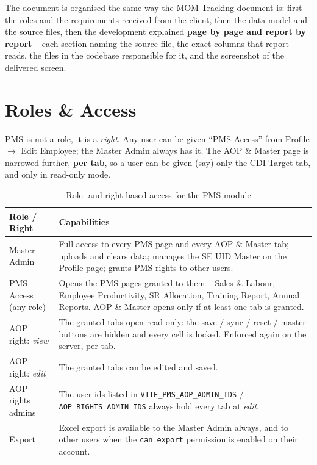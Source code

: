 \documentclass[11pt,a4paper]{article}
\newcommand{\qt}[1]{\textquotedblleft #1\textquotedblright}
\newcommand{\file}[1]{\texttt{\small #1}}
\begin{document}
The document is organised the same way the MOM Tracking document is: first the roles
and the requirements received from the client, then the data model and the source
files, then the development explained \textbf{page by page and report by report} --
each section naming the source file, the exact columns that report reads, the files in
the codebase responsible for it, and the screenshot of the delivered screen.

\section{Roles \& Access}

PMS is not a role, it is a \emph{right}. Any user can be given \qt{PMS Access} from
Profile $\rightarrow$ Edit Employee; the Master Admin always has it. The AOP \& Master
page is narrowed further, \textbf{per tab}, so a user can be given (say) only the CDI
Target tab, and only in read-only mode.

\begin{table}[H]\centering\small
\begin{tabularx}{\linewidth}{@{}p{3.4cm}X@{}}
\toprule
\textbf{Role / Right} & \textbf{Capabilities} \\
\midrule
Master Admin &
Full access to every PMS page and every AOP \& Master tab; uploads and clears data;
manages the SE UID Master on the Profile page; grants PMS rights to other users. \\
\addlinespace
PMS Access (any role) &
Opens the PMS pages granted to them -- Sales \& Labour, Employee Productivity,
SR Allocation, Training Report, Annual Reports. AOP \& Master opens only if at least
one tab is granted. \\
\addlinespace
AOP right: \textit{view} &
The granted tabs open read-only: the save / sync / reset / master buttons are hidden
and every cell is locked. Enforced again on the server, per tab. \\
\addlinespace
AOP right: \textit{edit} &
The granted tabs can be edited and saved. \\
\addlinespace
AOP rights admins &
The user ids listed in \file{VITE\_PMS\_AOP\_ADMIN\_IDS} /
\file{AOP\_RIGHTS\_ADMIN\_IDS} always hold every tab at \textit{edit}. \\
\addlinespace
Export &
Excel export is available to the Master Admin always, and to other users when the
\file{can\_export} permission is enabled on their account. \\
\bottomrule
\end{tabularx}
\caption{Role- and right-based access for the PMS module}
\end{table}
\end{document}
